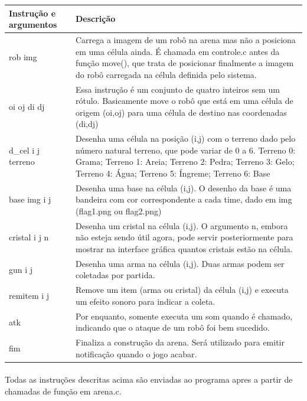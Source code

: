 \documentclass[a4paper]{article}
\begin{document}
 \begin{center}
 \begin{tabular}{| m{2cm} | m{10cm} |}
 \hline
 Instrução e argumentos & Descrição \\ [0.5ex]
 \hline \hline
 rob img & Carrega a imagem de um robô na arena mas não a posiciona em uma célula ainda. É chamada em controle.c antes da função move(), que trata de posicionar finalmente a imagem do robô carregada na célula definida pelo sistema. \\
 \hline
 oi oj di dj & Essa instrução é um conjunto de quatro inteiros sem um rótulo. Basicamente move o robô que está em uma célula de origem (oi,oj) para uma célula de destino nas coordenadas (di,dj)  \\
 \hline
 d\_cel i j terreno & Desenha uma célula na posição (i,j) com o terreno dado pelo número natural terreno, que pode variar de 0 a 6. Terreno 0: Grama; Terreno 1: Areia; Terreno 2: Pedra; Terreno 3: Gelo; Terreno 4: Água; Terreno 5: Íngreme; Terreno 6: Base\\
 \hline
 base img i j & Desenha uma base na célula (i,j). O desenho da base é uma bandeira com cor correspondente a cada time, dado em img (flag1.png ou flag2.png) \\
 \hline
 cristal i j n & Desenha um cristal na célula (i,j). O argumento n, embora não esteja sendo útil agora, pode servir posteriormente para mostrar na interface gráfica quantos cristais estão na célula. \\
 \hline
 gun i j & Desenha uma arma na célula (i,j). Duas armas podem ser coletadas por partida. \\
 \hline
 remitem i j & Remove um item (arma ou cristal) da célula (i,j) e executa um efeito sonoro para indicar a coleta. \\
 \hline
 atk & Por enquanto, somente executa um som quando é chamado, indicando que o ataque de um robô foi bem sucedido. \\
 \hline
 fim & Finaliza a construção da arena. Será utilizado para emitir notificação quando o jogo acabar. \\ [1ex]
 \hline
 \end{tabular}
 \end{center}
 
 \paragraph{}
 Todas as instruções descritas acima são enviadas ao programa apres a partir de chamadas de função em arena.c.
 
\end{document}
